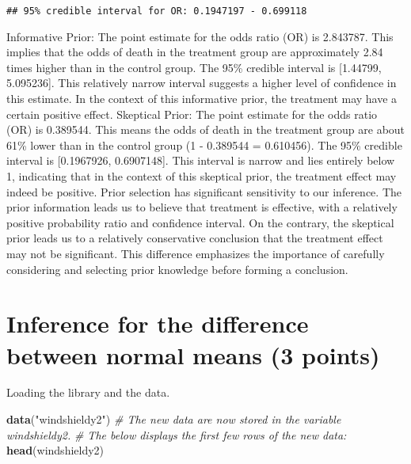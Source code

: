 \documentclass[
]{article}
\newenvironment{Shaded}{\begin{snugshade}}{\end{snugshade}}
\newcommand{\CommentTok}[1]{\textcolor[rgb]{0.56,0.35,0.01}{\textit{#1}}}
\newcommand{\FunctionTok}[1]{\textcolor[rgb]{0.13,0.29,0.53}{\textbf{#1}}}
\newcommand{\NormalTok}[1]{#1}
\newcommand{\StringTok}[1]{\textcolor[rgb]{0.31,0.60,0.02}{#1}}
\begin{document}
\begin{verbatim}
## 95% credible interval for OR: 0.1947197 - 0.699118
\end{verbatim}

Informative Prior: The point estimate for the odds ratio (OR) is
2.843787. This implies that the odds of death in the treatment group are
approximately 2.84 times higher than in the control group. The 95\%
credible interval is {[}1.44799, 5.095236{]}. This relatively narrow
interval suggests a higher level of confidence in this estimate. In the
context of this informative prior, the treatment may have a certain
positive effect. Skeptical Prior: The point estimate for the odds ratio
(OR) is 0.389544. This means the odds of death in the treatment group
are about 61\% lower than in the control group (1 - 0.389544 =
0.610456). The 95\% credible interval is {[}0.1967926, 0.6907148{]}.
This interval is narrow and lies entirely below 1, indicating that in
the context of this skeptical prior, the treatment effect may indeed be
positive. Prior selection has significant sensitivity to our inference.
The prior information leads us to believe that treatment is effective,
with a relatively positive probability ratio and confidence interval. On
the contrary, the skeptical prior leads us to a relatively conservative
conclusion that the treatment effect may not be significant. This
difference emphasizes the importance of carefully considering and
selecting prior knowledge before forming a conclusion.

\hypertarget{inference-for-the-difference-between-normal-means-3-points}{%
\section{Inference for the difference between normal means (3
points)}\label{inference-for-the-difference-between-normal-means-3-points}}

Loading the library and the data.

\begin{Shaded}
\begin{Highlighting}[]
\FunctionTok{data}\NormalTok{(}\StringTok{"windshieldy2"}\NormalTok{)}
\CommentTok{\# The new data are now stored in the variable \textasciigrave{}windshieldy2\textasciigrave{}.}
\CommentTok{\# The below displays the first few rows of the new data:}
\FunctionTok{head}\NormalTok{(windshieldy2)}
\end{Highlighting}
\end{Shaded}
\end{document}
